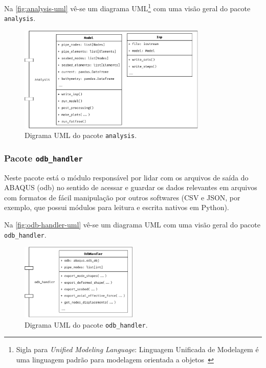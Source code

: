 Na \autoref{fig:analysis-uml} vê-se um diagrama UML\footnote{Sigla para \textit{Unified Modeling Language}: Linguagem Unificada de Modelagem é uma linguagem padrão para modelagem orientada a objetos~\cite{infoescolauml}} com uma visão geral do pacote \texttt{analysis}.

\begin{figure}[!ht]
    \centering
    \caption{Digrama UML do pacote \texttt{analysis}.}\label{fig:analysis-uml}
    \includegraphics[width=0.8\textwidth]{imagens/analysis-uml}
\end{figure}


\subsubsection{Pacote \texttt{odb\_handler}}


Neste pacote está o módulo responsável por lidar com os arquivos de saída do ABAQUS (odb) no sentido de acessar e guardar os dados relevantes em arquivos com formatos de fácil manipulação por outros softwares (CSV e JSON, por exemplo, que possui módulos para leitura e escrita nativos em Python).

Na \autoref{fig:odb-handler-uml} vê-se um diagrama UML com uma visão geral do pacote \texttt{odb\_handler}.

\begin{figure}[!ht]
    \centering
    \caption{Digrama UML do pacote \texttt{odb\_handler}.}\label{fig:odb-handler-uml}
    \includegraphics[width=0.5\textwidth]{imagens/odb-handler-uml}
\end{figure}


